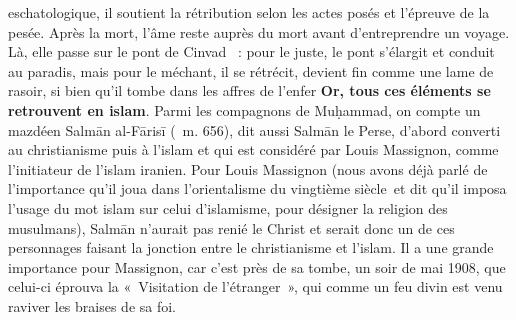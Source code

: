 eschatologique, il soutient la rétribution selon les actes posés et
l'épreuve de la pesée. Après la mort, l'âme reste auprès du mort avant
d'entreprendre un voyage. Là, elle passe sur le pont de Cinvad ~: pour
le juste, le pont s'élargit et conduit au paradis, mais pour le méchant,
il se rétrécit, devient fin comme une lame de rasoir, si bien qu'il
tombe dans les affres de l'enfer \textbf{Or, tous ces éléments se
retrouvent en islam}. Parmi les compagnons de Muḥammad, on compte un
mazdéen Salmān al-Fārisī (~m. 656), dit aussi Salmān le Perse, d'abord
converti au christianisme puis à l'islam et qui est considéré par Louis
Massignon, comme l'initiateur de l'islam iranien. Pour Louis Massignon
(nous avons déjà parlé de l'importance qu'il joua dans l'orientalisme du
vingtième siècle~et dit qu'il imposa l'usage du mot islam sur celui
d'islamisme, pour désigner la religion des musulmans), Salmān n'aurait
pas renié le Christ et serait donc un de ces personnages faisant la
jonction entre le christianisme et l'islam. Il a une grande importance
pour Massignon, car c'est près de sa tombe, un soir de mai 1908, que
celui-ci éprouva la «~Visitation de l'étranger~», qui comme un feu divin
est venu raviver les braises de sa foi.
\FloatBarrier



